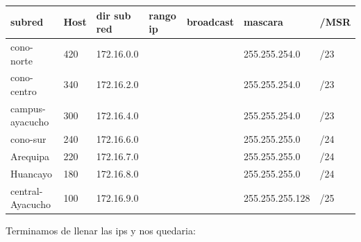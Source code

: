 \begin{landscape}
\begin{table}[htbp]
\begin{tabular}{|l|l|l|l|l|l|l|}
\hline
\rowcolor[HTML]{32CB00} 
\textbf{subred}  & Host & \textbf{dir sub red} & \textbf{rango ip} & \textbf{broadcast} & \textbf{mascara} & \textbf{/MSR} \\ \hline
cono-norte       & 420  & 172.16.0.0           &                   &                    & 255.255.254.0    & /23           \\ \hline
cono-centro      & 340  & 172.16.2.0           &                   &                    & 255.255.254.0    & /23           \\ \hline
campus-ayacucho  & 300  & 172.16.4.0           &                   &                    & 255.255.254.0    & /23           \\ \hline
cono-sur         & 240  & 172.16.6.0           &                   &                    & 255.255.255.0    & /24           \\ \hline
Arequipa         & 220  & 172.16.7.0           &                   &                    & 255.255.255.0    & /24           \\ \hline
Huancayo         & 180  & 172.16.8.0           &                   &                    & 255.255.255.0    & /24           \\ \hline
central-Ayacucho & 100  & 172.16.9.0           &                   &                    & 255.255.255.128  & /25           \\ \hline
\end{tabular}
\end{table}


Terminamos de llenar las ips y nos quedaria:


\end{landscape}

